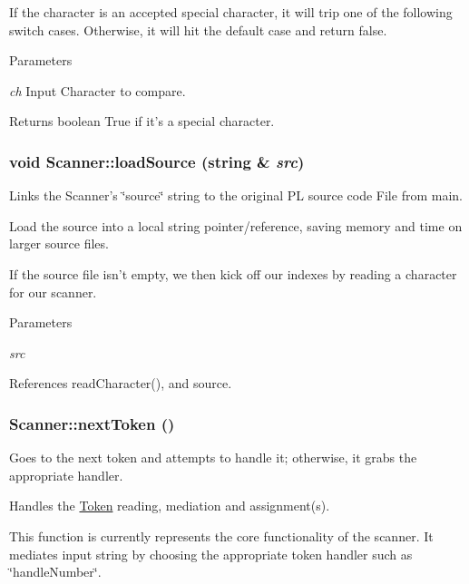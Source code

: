 If the character is an accepted special character, it will trip one of the following switch cases. Otherwise, it will hit the default case and return false. 
\begin{DoxyParams}{Parameters}
\item[{\em ch}]Input Character to compare. \end{DoxyParams}
\begin{DoxyReturn}{Returns}
boolean True if it's a special character. 
\end{DoxyReturn}
\hypertarget{classScanner_a7fb5a6640567b85bd3b9dab76751dbb0}{
\subsubsection[{loadSource}]{\setlength{\rightskip}{0pt plus 5cm}void Scanner::loadSource (string \& {\em src})}}
\label{classScanner_a7fb5a6640567b85bd3b9dab76751dbb0}


Links the Scanner's \char`\"{}source\char`\"{} string to the original PL source code File from main. 

Load the source into a local string pointer/reference, saving memory and time on larger source files.

If the source file isn't empty, we then kick off our indexes by reading a character for our scanner. 
\begin{DoxyParams}{Parameters}
\item[{\em src}]\end{DoxyParams}


References readCharacter(), and source.

\hypertarget{classScanner_ab43ce10667c1f695a396844449d3ab7d}{
\subsubsection[{nextToken}]{ Scanner::nextToken ()}}
\label{classScanner_ab43ce10667c1f695a396844449d3ab7d}


Goes to the next token and attempts to handle it; otherwise, it grabs the appropriate handler. 

Handles the \hyperlink{classToken}{Token} reading, mediation and assignment(s).

This function is currently represents the core functionality of the scanner. It mediates input string by choosing the appropriate token handler such as \char`\"{}handleNumber\char`\"{}.

